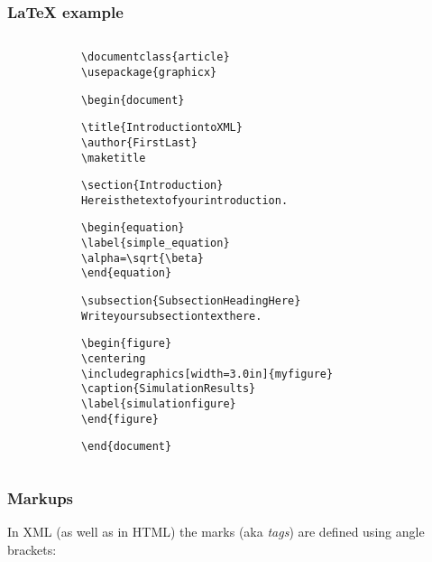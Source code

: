 \documentclass[12pt]{beamer}\usepackage[]{graphicx}\usepackage[]{color}
\makeatletter
\newenvironment{kframe}{%
 \def\at@end@of@kframe{}%
 \ifinner\ifhmode%
  \def\at@end@of@kframe{\end{minipage}}%
  \begin{minipage}{\columnwidth}%
 \fi\fi%
 \def\FrameCommand##1{\hskip\@totalleftmargin \hskip-\fboxsep
 \colorbox{shadecolor}{##1}\hskip-\fboxsep
     \hskip-\linewidth \hskip-\@totalleftmargin \hskip\columnwidth}%
 \MakeFramed {\advance\hsize-\width
   \@totalleftmargin\z@ \linewidth\hsize
   \@setminipage}}%
 {\par\unskip\endMakeFramed%
 \at@end@of@kframe}
\newenvironment{knitrout}{}{} %
\makeatother
\begin{document}
\begin{frame}[fragile]
\frametitle{LaTeX example}

\begin{columns}[t]
\begin{column}{0.1\textwidth}
\end{column}
\begin{column}{0.6\textwidth}
\begin{knitrout}\tiny
{}\color{fgcolor}\begin{kframe}
\begin{alltt}
\textbackslash{}documentclass\{article\}
\textbackslash{}usepackage\{graphicx\}

\textbackslash{}begin\{document\}

\textbackslash{}title\{Introduction to XML\}
\textbackslash{}author\{First Last\}
\textbackslash{}maketitle

\textbackslash{}section\{Introduction\}
Here is the text of your introduction.

\textbackslash{}begin\{equation\}
    \textbackslash{}label\{simple_equation\}
    \textbackslash{}alpha = \textbackslash{}sqrt\{ \textbackslash{}beta \}
\textbackslash{}end\{equation\}

\textbackslash{}subsection\{Subsection Heading Here\}
Write your subsection text here.

\textbackslash{}begin\{figure\}
    \textbackslash{}centering
    \textbackslash{}includegraphics[width=3.0in]\{myfigure\}
    \textbackslash{}caption\{Simulation Results\}
    \textbackslash{}label\{simulationfigure\}
\textbackslash{}end\{figure\}

\textbackslash{}end\{document\}
\end{alltt}
\end{kframe}
\end{knitrout}
\end{column}

\begin{column}{0.1\textwidth}
\end{column}

\end{columns}

\end{frame}


\begin{frame}[fragile]
\frametitle{Markups}

In XML (as well as in HTML) the marks (aka \textit{tags}) are defined using angle brackets: {\Large {\hilit \code{<>}}}
\eb

\bigskip


\end{frame}
\end{document}
